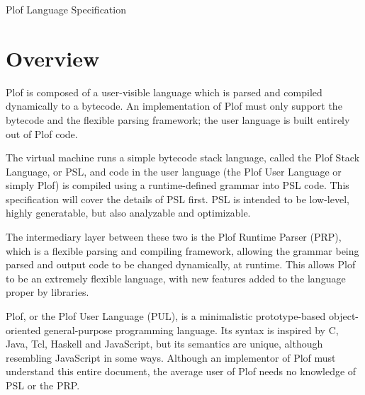 \setlength{\pdfpageheight}{\paperheight}
\setlength{\pdfpagewidth}{\paperwidth}



\ifdefined\specdocheader
    \specdocheader
\else\fi

\begin{titlepage}
\begin{center}

\Huge{\textsf{Plof Language Specification}}

\Large{\textsf{}}

\large{}

\end{center}
\end{titlepage}

\tableofcontents

\part{Overview}

Plof is composed of a user-visible language which is parsed and compiled dynamically to a bytecode. An implementation of Plof must only support the bytecode and the flexible parsing framework; the user language is built entirely out of Plof code.

The virtual machine runs a simple bytecode stack language, called the Plof Stack Language, or PSL, and code in the user language (the Plof User Language or simply Plof) is compiled using a runtime-defined grammar into PSL code. This specification will cover the details of PSL first. PSL is intended to be low-level, highly generatable, but also analyzable and optimizable.

The intermediary layer between these two is the Plof Runtime Parser (PRP), which is a flexible parsing and compiling framework, allowing the grammar being parsed and output code to be changed dynamically, at runtime. This allows Plof to be an extremely flexible language, with new features added to the language proper by libraries.

Plof, or the Plof User Language (PUL), is a minimalistic prototype-based object-oriented general-purpose programming language. Its syntax is inspired by C, Java, Tcl, Haskell and JavaScript, but its semantics are unique, although resembling JavaScript in some ways. Although an implementor of Plof must understand this entire document, the average user of Plof needs no knowledge of PSL or the PRP.



